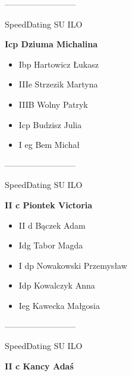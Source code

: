 \documentclass[a4paper,10pt]{article}
\begin{document}
\begin{multicols}{3}
\begin{minipage}[l]{\textwidth}
\begin{itemize}
    \end{itemize}



\end{minipage}



\begin{minipage}[l]{\textwidth}
--------------------------

  \footnotesize{SpeedDating SU ILO}

  \bfseries{Icp Dziuma Michalina}

  \begin{itemize}
    \item Ibp Hartowicz Łukasz
    \item IIIe Strzezik Martyna
    \item IIIB Wolny Patryk
    \item Icp Budzisz Julia
    \item I eg Bem Michał

    \end{itemize}



\end{minipage}



\begin{minipage}[l]{\textwidth}
--------------------------

  \footnotesize{SpeedDating SU ILO}

  \bfseries{II c Piontek Victoria}

  \begin{itemize}
    \item II d Bączek Adam
    \item Idg Tabor Magda
    \item I dp Nowakowski Przemysław
    \item Idp Kowalczyk Anna
    \item Ieg Kawecka Małgosia

    \end{itemize}



\end{minipage}



\begin{minipage}[l]{\textwidth}
--------------------------

  \footnotesize{SpeedDating SU ILO}

  \bfseries{II c Kancy Adaś}


\end{minipage}
\end{multicols}
\end{document}
